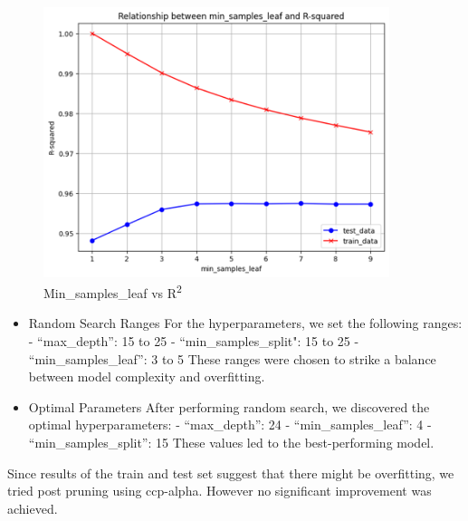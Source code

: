 \documentclass{article}
\begin{document}
\begin{figure}[h]
    \vspace{0.5cm} %
    \begin{minipage}{0.6\textwidth}
        \centering
        \includegraphics[width=0.9\textwidth]{unnamed-3.png}
        \caption{Min\_samples\_leaf vs R\textsuperscript{2}}
        \label{pic3} %
    \end{minipage}
    
 
\end{figure}






\begin{itemize}

    \item Random Search Ranges
For the hyperparameters, we set the following ranges:
- “max\_depth”: 15 to 25
- “min\_samples\_split": 15 to 25
- “min\_samples\_leaf”: 3 to 5
These ranges were chosen to strike a balance between model complexity and overfitting.

    \item Optimal Parameters
After performing random search, we discovered the optimal hyperparameters:
- “max\_depth”: 24
- “min\_samples\_leaf”: 4
- “min\_samples\_split”: 15
These values led to the best-performing model.

\end{itemize}

Since results of the train and test set suggest that there might be overfitting, we tried post pruning using ccp-alpha.
However no significant improvement was achieved.
\end{document}
